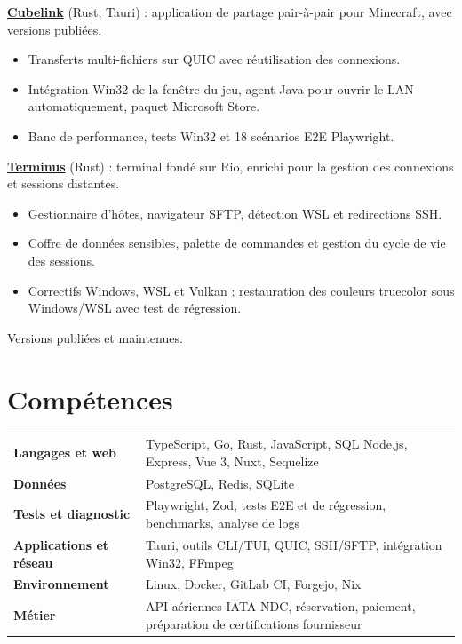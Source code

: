 \documentclass[10pt,a4paper]{article}
\newcommand{\project}[3]{\textbf{#1} {\color{muted}(#2)} : #3\par\vspace{1pt}}
\newcommand{\proof}[1]{{\small\color{muted}#1}\par}
\newcommand{\projectgap}{\vspace{7pt}}
\begin{document}
\project{\href{https://github.com/delikesance/cubelink}{Cubelink}}{Rust, Tauri}{application de partage pair-à-pair pour Minecraft, avec versions publiées.}
\begin{itemize}
  \item Transferts multi-fichiers sur QUIC avec réutilisation des connexions.
  \item Intégration Win32 de la fenêtre du jeu, agent Java pour ouvrir le LAN automatiquement, paquet Microsoft Store.
  \item Banc de performance, tests Win32 et 18 scénarios E2E Playwright.
\end{itemize}
\projectgap

\project{\href{https://github.com/delikesance/terminus}{Terminus}}{Rust}{terminal fondé sur Rio, enrichi pour la gestion des connexions et sessions distantes.}
\begin{itemize}
  \item Gestionnaire d'hôtes, navigateur SFTP, détection WSL et redirections SSH.
  \item Coffre de données sensibles, palette de commandes et gestion du cycle de vie des sessions.
  \item Correctifs Windows, WSL et Vulkan ; restauration des couleurs truecolor sous Windows/WSL avec test de régression.
\end{itemize}
\proof{Versions publiées et maintenues.}

\section{Compétences}
{\small
\begin{tabular}{@{}p{3.4cm}p{13.8cm}@{}}
\textbf{Langages et web} & TypeScript, Go, Rust, JavaScript, SQL \textperiodcentered{} Node.js, Express, Vue 3, Nuxt, Sequelize \\
\textbf{Données} & PostgreSQL, Redis, SQLite \\
\textbf{Tests et diagnostic} & Playwright, Zod, tests E2E et de régression, benchmarks, analyse de logs \\
\textbf{Applications et réseau} & Tauri, outils CLI/TUI, QUIC, SSH/SFTP, intégration Win32, FFmpeg \\
\textbf{Environnement} & Linux, Docker, GitLab CI, Forgejo, Nix \\
\textbf{Métier} & API aériennes IATA NDC, réservation, paiement, préparation de certifications fournisseur \\
\end{tabular}}
\end{document}
